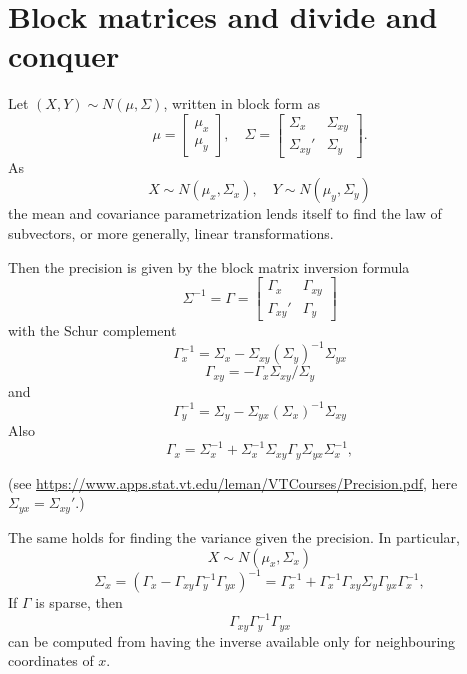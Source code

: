 \documentclass[11pt]{article}
\begin{document}
\section{Block matrices and divide and conquer}
Let $ (X,Y) \sim N(\mu, \Sigma)$, written in block form as
\[
\mu = \begin{bmatrix}\mu_x\\ \mu_y\end{bmatrix}, \quad \Sigma = \begin{bmatrix}\Sigma_{x} & \Sigma_{xy} \\ \Sigma_{xy}' &\Sigma_{y} \end{bmatrix}.
\]
As
\[
X \sim N(\mu_x, \Sigma_x), \quad Y \sim N(\mu_y, \Sigma_y)
\]
the mean and covariance parametrization lends itself to find the law of subvectors, or more generally, linear transformations.


Then the precision is given by the block matrix inversion formula
\[
\Sigma^{-1} = \Gamma = 
\begin{bmatrix}\Gamma_{x} & \Gamma_{xy} \\ \Gamma_{xy}' &\Gamma_{y} \end{bmatrix}
\]
with the Schur complement
\[
\Gamma_{x}^{-1} = \Sigma_{x} - \Sigma_{xy}(\Sigma_{y})^{-1} \Sigma_{yx}
\]
\[
\Gamma_{xy} = -\Gamma_{x} \Sigma_{xy} / \Sigma_y
\]
and
\[
\Gamma_{y}^{-1} = \Sigma_{y} - \Sigma_{yx}(\Sigma_{x})^{-1} \Sigma_{xy}
\]
Also
\[
\Gamma_x = \Sigma_x^{{-1}}+\Sigma_x^{{-1}}\Sigma_{xy}\Gamma_y\Sigma_{yx}\Sigma_x^{{-1}},
\]



(see \url{https://www.apps.stat.vt.edu/leman/VTCourses/Precision.pdf}, here $\Sigma_{yx} = \Sigma_{xy}'$.)

The same holds for finding the variance  given the precision.
In particular,
\[
X \sim N(\mu_x, \Sigma_x)
\]
\[
\Sigma_x =  (\Gamma_x - \Gamma_{xy}\Gamma_y^{-1} \Gamma_{yx})^{-1} = \Gamma_x^{{-1}}+\Gamma_x^{{-1}}\Gamma_{xy}\Sigma_y\Gamma_{yx}\Gamma_x^{{-1}},
\]
If $\Gamma$ is sparse, then 
\[
  \Gamma_{xy}\Gamma_y^{-1} \Gamma_{yx} 
\]
can be computed from having the inverse available only for neighbouring coordinates of $x$.
\end{document}
